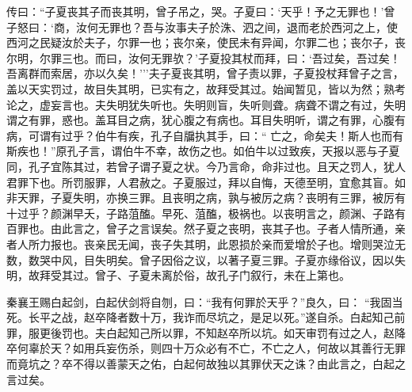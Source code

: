 \documentclass[]{article}
\begin{document}
传曰：``子夏丧其子而丧其明，曾子吊之，哭。子夏曰：`天乎！予之无罪也！'曾子怒曰：`商，汝何无罪也？吾与汝事夫子於洙、泗之间，退而老於西河之上，使西河之民疑汝於夫子，尔罪一也；丧尔亲，使民未有异闻，尔罪二也；丧尔子，丧尔明，尔罪三也。而曰，汝何无罪欤？'子夏投其杖而拜，曰：`吾过矣，吾过矣！吾离群而索居，亦以久矣！'''夫子夏丧其明，曾子责以罪，子夏投杖拜曾子之言，盖以天实罚过，故目失其明，已实有之，故拜受其过。始闻暂见，皆以为然；熟考论之，虚妄言也。夫失明犹失听也。失明则盲，失听则聋。病聋不谓之有过，失明谓之有罪，惑也。盖耳目之病，犹心腹之有病也。耳目失明听，谓之有罪，心腹有病，可谓有过乎？伯牛有疾，孔子自牖执其手，曰：``
亡之，命矣夫！斯人也而有斯疾也！''原孔子言，谓伯牛不幸，故伤之也。如伯牛以过致疾，天报以恶与子夏同，孔子宜陈其过，若曾子谓子夏之状。今乃言命，命非过也。且天之罚人，犹人君罪下也。所罚服罪，人君赦之。子夏服过，拜以自悔，天德至明，宜愈其盲。如非天罪，子夏失明，亦换三罪。且丧明之病，孰与被厉之病？丧明有三罪，被厉有十过乎？颜渊早夭，子路菹醢。早死、菹醢，极祸也。以丧明言之，颜渊、子路有百罪也。由此言之，曾子之言误矣。然子夏之丧明，丧其子也。子者人情所通，亲者人所力报也。丧亲民无闻，丧子失其明，此恩损於亲而爱增於子也。增则哭泣无数，数哭中风，目失明矣。曾子因俗之议，以著子夏三罪。子夏亦缘俗议，因以失明，故拜受其过。曾子、子夏未离於俗，故孔子门叙行，未在上第也。

秦襄王赐白起剑，白起伏剑将自刎，曰：``我有何罪於天乎？''良久，曰：
``我固当死。长平之战，赵卒降者数十万，我诈而尽坑之，是足以死。''遂自杀。白起知己前罪，服更後罚也。夫白起知己所以罪，不知赵卒所以坑。如天审罚有过之人，赵降卒何辜於天？如用兵妄伤杀，则四十万众必有不亡，不亡之人，何故以其善行无罪而竟坑之？卒不得以善蒙天之佑，白起何故独以其罪伏天之诛？由此言之，白起之言过矣。
\end{document}
